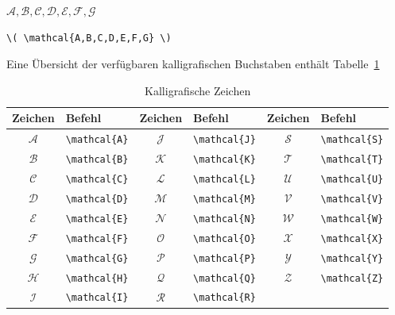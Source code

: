 \documentclass[a4paper,10pt,twoside]{scrbook}
\begin{document}
{\begin{minipage}[c]{.4\textwidth}
\setlength{\parskip}{1em}
\centering
\( \mathcal{A,B,C,D,E,F,G} \)
\end{minipage}
\hfill
\begin{minipage}[c]{.58\textwidth}
\setlength{\parskip}{1em}
\begin{lstlisting}[label=mathcalbeispiel, style=customlatex]
\( \mathcal{A,B,C,D,E,F,G} \)
\end{lstlisting}
\end{minipage}

Eine Übersicht der verfügbaren kalligrafischen Buchstaben
enthält Tabelle~\ref{Tabelle_Kalligrafische_Buchstaben3}  


\begin{table}[h!tb]
\centering
\caption{Kalligrafische Zeichen}
\label{Tabelle_Kalligrafische_Buchstaben3}       %
\begin{tabular}{clclcl}
\hline
Zeichen & Befehl & Zeichen & Befehl & Zeichen & Befehl \\
\hline
\(\mathcal{A}\) & \texttt{\textbackslash mathcal\{A\}} &
\(\mathcal{J}\) & \texttt{\textbackslash mathcal\{J\}} & 
\(\mathcal{S}\) & \texttt{\textbackslash mathcal\{S\}} \\
\(\mathcal{B}\) & \texttt{\textbackslash mathcal\{B\}} & 
\(\mathcal{K}\) & \texttt{\textbackslash mathcal\{K\}} &
\(\mathcal{T}\) & \texttt{\textbackslash mathcal\{T\}} \\
\(\mathcal{C}\) & \texttt{\textbackslash mathcal\{C\}} & 
\(\mathcal{L}\) & \texttt{\textbackslash mathcal\{L\}} &
\(\mathcal{U}\) & \texttt{\textbackslash mathcal\{U\}} \\
\(\mathcal{D}\) & \texttt{\textbackslash mathcal\{D\}} & 
\(\mathcal{M}\) & \texttt{\textbackslash mathcal\{M\}} &
\(\mathcal{V}\) & \texttt{\textbackslash mathcal\{V\}}\\
\(\mathcal{E}\) & \texttt{\textbackslash mathcal\{E\}} & 
\(\mathcal{N}\) & \texttt{\textbackslash mathcal\{N\}} &
\(\mathcal{W}\) & \texttt{\textbackslash mathcal\{W\}}\\
\(\mathcal{F}\) & \texttt{\textbackslash mathcal\{F\}} & 
\(\mathcal{O}\) & \texttt{\textbackslash mathcal\{O\}} &
\(\mathcal{X}\) & \texttt{\textbackslash mathcal\{X\}}\\
\(\mathcal{G}\) & \texttt{\textbackslash mathcal\{G\}} & 
\(\mathcal{P}\) & \texttt{\textbackslash mathcal\{P\}} &
\(\mathcal{Y}\) & \texttt{\textbackslash mathcal\{Y\}}\\
\(\mathcal{H}\) & \texttt{\textbackslash mathcal\{H\}} &
\(\mathcal{Q}\) & \texttt{\textbackslash mathcal\{Q\}} &
\(\mathcal{Z}\) & \texttt{\textbackslash mathcal\{Z\}}\\
\(\mathcal{I}\) & \texttt{\textbackslash mathcal\{I\}} &
\(\mathcal{R}\) & \texttt{\textbackslash mathcal\{R\}} & 
& \\
\hline
\end{tabular}
\end{table}



}
\end{document}

